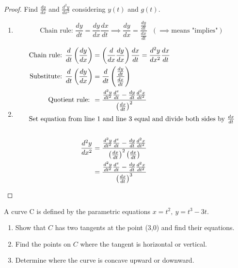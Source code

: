     \begin{minipage}{\linewidth}
      \begin{proof}\let\qed\relax
        Find $\frac{dy}{dx}$ and $\frac{d^2 y}{dx^2}$ considering $y(t)$ and $g(t)$.
        \begin{enumerate}
          \item \begin{equation*}
            \text{Chain rule: } \frac{dy}{dt} = \frac{dy}{dx}\frac{dx}{dt} \implies \frac{dy}{dx} = \frac{\frac{dy}{dt}}{\frac{dx}{dt}} \ \ \ (\implies \text{means "implies"})
          \end{equation*}
          \item \begin{align*}
            \text{Chain rule: } \frac{d}{dt}\left(\frac{dy}{dx}\right) &= \left(\frac{d}{dx}\frac{dy}{dx}\right)\frac{dx}{dt} = \frac{d^2 y}{dx^2}\frac{dx}{dt} \\
            \text{Substitute: } \frac{d}{dt}\left(\frac{dy}{dx}\right) &= \frac{d}{dt}\left(\frac{\frac{dy}{dt}}{\frac{dx}{dt}}\right) \\
            \text{Quotient rule: } &= \frac{\frac{d^2 y}{dt^2}\frac{d^x}{dt} - \frac{dy}{dt}\frac{d^2 x}{dt^2}}{\left(\frac{dx}{dt}\right)^2} \\
            \intertext{Set equation from line 1 and line 3 equal and divide both sides by $\frac{dx}{dt}$} \\
            \frac{d^2 y}{dx^2} &= \frac{\frac{d^2 y}{dt^2}\frac{d^x}{dt} - \frac{dy}{dt}\frac{d^2 x}{dt^2}}{\left(\frac{dx}{dt}\right)^2 \left(\frac{dx}{dt}\right)} \\
            &= \frac{\frac{d^2 y}{dt^2}\frac{d^x}{dt} - \frac{dy}{dt}\frac{d^2 x}{dt^2}}{\left(\frac{dx}{dt}\right)^3}
          \end{align*}
        \end{enumerate}
      \end{proof}
    \end{minipage}
    \begin{example}
      A curve C is defined by the parametric equations $ {x=t^2 ,\ y=t^3 -3t }$.
      \begin{enumerate}
        \item Show that $C$ has two tangents at the point (3,0) and find their equations.
        \item Find the points on $C$ where the tangent is horizontal or vertical.
        \item Determine where the curve is concave upward or downward.
      \end{enumerate}
    \end{example}
